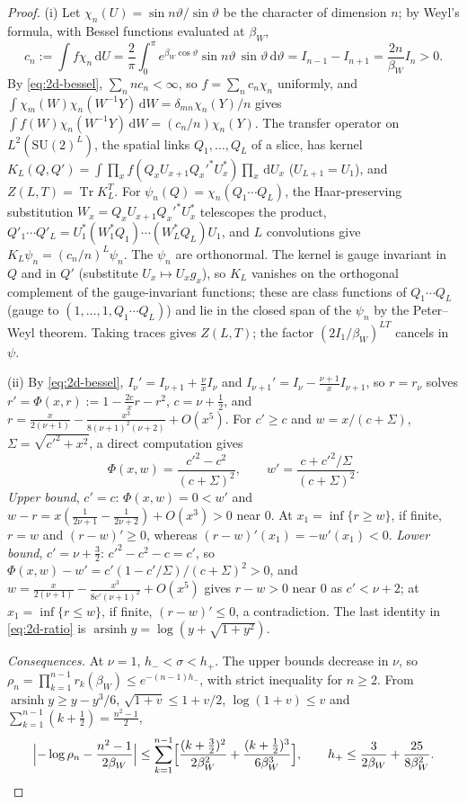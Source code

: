 \documentclass[11pt,a4paper]{amsart}
\theoremstyle{definition}
\theoremstyle{remark}
\numberwithin{equation}{section}
\DeclareMathOperator{\Tr}{Tr}        %
\newcommand{\dd}{\,\mathrm{d}}             %
\newcommand{\SU}{\mathrm{SU}}              %
\newcommand{\Zpart}[2]{Z(#1,#2)}           %
\newcommand{\betaW}{\beta_{W}}             %
\begin{document}
\begin{proof}
(i) Let $\chi_n(U)=\sin n\vartheta/\sin\vartheta$ be the character of dimension $n$; by Weyl's formula, with Bessel functions evaluated at $\betaW$,
\[
c_n:=\int f\chi_n\dd U=\frac2\pi\int_0^\pi e^{\betaW\cos\vartheta}\sin n\vartheta\,\sin\vartheta\dd\vartheta=I_{n-1}-I_{n+1}=\frac{2n}{\betaW}I_n>0 .
\]
By \eqref{eq:2d-bessel}, $\sum_nnc_n<\infty$, so $f=\sum_nc_n\chi_n$ uniformly, and $\int\chi_m(W)\chi_n(W^{-1}Y)\dd W=\delta_{mn}\chi_n(Y)/n$ gives $\int f(W)\chi_n(W^{-1}Y)\dd W=(c_n/n)\chi_n(Y)$. The transfer operator on $L^2(\SU(2)^L)$, the spatial links $Q_1,\dots,Q_L$ of a slice, has kernel $K_L(Q,Q')=\int\prod_xf(Q_xU_{x+1}Q_x'^{*}U_x^{*})\prod_x\dd U_x$ ($U_{L+1}=U_1$), and $\Zpart{L}{T}=\Tr K_L^T$. For $\psi_n(Q)=\chi_n(Q_1\cdots Q_L)$, the Haar-preserving substitution $W_x=Q_xU_{x+1}Q_x'^*U_x^*$ telescopes the product, $Q'_1\cdots Q'_L=U_1^*(W_1^*Q_1)\cdots(W_L^*Q_L)U_1$, and $L$ convolutions give $K_L\psi_n=(c_n/n)^L\psi_n$. The $\psi_n$ are orthonormal. The kernel is gauge invariant in $Q$ and in $Q'$ (substitute $U_x\mapsto U_xg_x$), so $K_L$ vanishes on the orthogonal complement of the gauge-invariant functions; these are class functions of $Q_1\cdots Q_L$ (gauge to $(1,\dots,1,Q_1\cdots Q_L)$) and lie in the closed span of the $\psi_n$ by the Peter--Weyl theorem. Taking traces gives $\Zpart{L}{T}$; the factor $(2I_1/\betaW)^{LT}$ cancels in $\psi$.

(ii) By \eqref{eq:2d-bessel}, $I_\nu'=I_{\nu+1}+\frac\nu xI_\nu$ and $I_{\nu+1}'=I_\nu-\frac{\nu+1}{x}I_{\nu+1}$, so $r=r_\nu$ solves $r'=\Phi(x,r):=1-\frac{2c}{x}r-r^2$, $c=\nu+\frac12$, and $r=\frac{x}{2(\nu+1)}-\frac{x^3}{8(\nu+1)^2(\nu+2)}+O(x^5)$. For $c'\ge c$ and $w=x/(c+\Sigma)$, $\Sigma=\sqrt{c'^2+x^2}$, a direct computation gives
\[
\Phi(x,w)=\frac{c'^2-c^2}{(c+\Sigma)^2},\qquad w'=\frac{c+c'^2/\Sigma}{(c+\Sigma)^2}.
\]
\emph{Upper bound}, $c'=c$: $\Phi(x,w)=0<w'$ and $w-r=x(\frac1{2\nu+1}-\frac1{2\nu+2})+O(x^3)>0$ near $0$. At $x_1=\inf\{r\ge w\}$, if finite, $r=w$ and $(r-w)'\ge0$, whereas $(r-w)'(x_1)=-w'(x_1)<0$. \emph{Lower bound}, $c'=\nu+\frac32$: $c'^2-c^2-c=c'$, so $\Phi(x,w)-w'=c'(1-c'/\Sigma)/(c+\Sigma)^2>0$, and $w=\frac{x}{2(\nu+1)}-\frac{x^3}{8c'(\nu+1)^2}+O(x^5)$ gives $r-w>0$ near $0$ as $c'<\nu+2$; at $x_1=\inf\{r\le w\}$, if finite, $(r-w)'\le0$, a contradiction. The last identity in \eqref{eq:2d-ratio} is $\operatorname{arsinh}y=\log(y+\sqrt{1+y^2})$.

\emph{Consequences.} At $\nu=1$, $h_-<\sigma<h_+$. The upper bounds decrease in $\nu$, so $\rho_n=\prod_{k=1}^{n-1}r_k(\betaW)\le e^{-(n-1)h_-}$, with strict inequality for $n\ge2$. From $\operatorname{arsinh}y\ge y-y^3/6$, $\sqrt{1+v}\le1+v/2$, $\log(1+v)\le v$ and $\sum_{k=1}^{n-1}(k+\frac12)=\frac{n^2-1}2$,
\begin{equation}\label{eq:2d-rhon}
\Bigl\lvert-\log\rho_n-\frac{n^2-1}{2\betaW}\Bigr\rvert\le\sum_{k=1}^{n-1}\Bigl[\frac{(k+\frac32)^2}{2\betaW^2}+\frac{(k+\frac12)^3}{6\betaW^3}\Bigr],\qquad h_+\le\frac{3}{2\betaW}+\frac{25}{8\betaW^2}.
\end{equation}


\end{proof}
\end{document}
